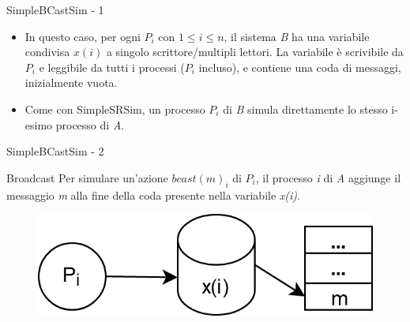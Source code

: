\documentclass{beamer}
\begin{document}
    \begin{frame}{SimpleBCastSim - 1}
        \begin{itemize}[<+->]
            \item In questo caso, per ogni $P_{i}$ con $1 \leq i \leq n$, il sistema \textit{B} ha una variabile condivisa $x(i)$ a singolo scrittore/multipli lettori.
            \newline La variabile è scrivibile da $P_{i}$ e leggibile da tutti i processi ($P_{i}$ incluso), e contiene una coda di messaggi, inizialmente vuota.
            \item Come con SimpleSRSim, un processo $P_{i}$ di \textit{B} simula direttamente lo stesso i-esimo processo di \textit{A}.
        \end{itemize}
    \end{frame}

    \begin{frame}{SimpleBCastSim - 2}
        \begin{block}{Broadcast}
            Per simulare un'azione $bcast(m)_{i}$ di $P_{i}$, il processo \textit{i} di \textit{A} aggiunge il messaggio \textit{m} alla fine della coda presente nella variabile \textit{x(i)}.
            \begin{figure}
                \centering
                \includegraphics[scale=0.3]{Broadcast.png}
            \end{figure}
        \end{block}
    \end{frame}
\end{document}
